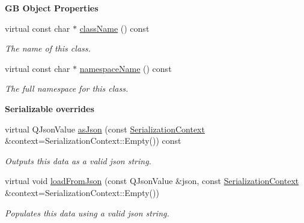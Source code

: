 \begin{Indent}\textbf{ GB Object Properties}\par
\begin{DoxyCompactItemize}
\item 
virtual const char $\ast$ \mbox{\hyperlink{classrev_1_1_file_manager_abfb467bdcfbacd82f041139a15d73fa0}{class\+Name}} () const
\begin{DoxyCompactList}\small\item\em The name of this class. \end{DoxyCompactList}\item 
virtual const char $\ast$ \mbox{\hyperlink{classrev_1_1_file_manager_a57e18b80b80bde22fb0917daae4662bc}{namespace\+Name}} () const
\begin{DoxyCompactList}\small\item\em The full namespace for this class. \end{DoxyCompactList}\end{DoxyCompactItemize}
\end{Indent}
\begin{Indent}\textbf{ Serializable overrides}\par
\begin{DoxyCompactItemize}
\item 
\mbox{\label{classrev_1_1_file_manager_ae06482002349343102be11d7f914dc86}} 
virtual Q\+Json\+Value \mbox{\hyperlink{classrev_1_1_file_manager_ae06482002349343102be11d7f914dc86}{as\+Json}} (const \mbox{\hyperlink{structrev_1_1_serialization_context}{Serialization\+Context}} \&context=Serialization\+Context\+::\+Empty()) const
\begin{DoxyCompactList}\small\item\em Outputs this data as a valid json string. \end{DoxyCompactList}\item 
\mbox{\label{classrev_1_1_file_manager_ada557ded1dd5e49a848e2c9c60402271}} 
virtual void \mbox{\hyperlink{classrev_1_1_file_manager_ada557ded1dd5e49a848e2c9c60402271}{load\+From\+Json}} (const Q\+Json\+Value \&json, const \mbox{\hyperlink{structrev_1_1_serialization_context}{Serialization\+Context}} \&context=Serialization\+Context\+::\+Empty())
\begin{DoxyCompactList}\small\item\em Populates this data using a valid json string. \end{DoxyCompactList}\end{DoxyCompactItemize}
\end{Indent}
